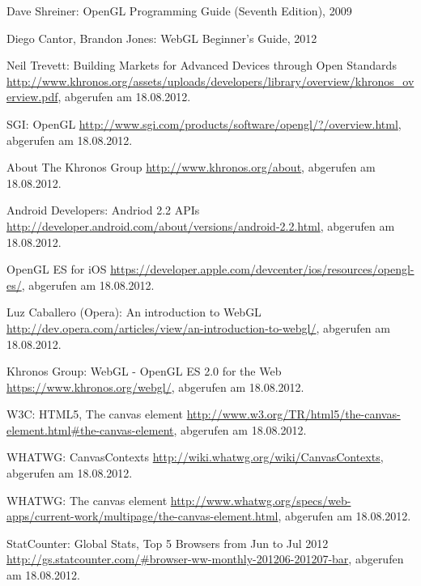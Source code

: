 \begin{thebibliography}{99}

    Dave Shreiner:
    OpenGL Programming Guide (Seventh Edition), 2009

    Diego Cantor, Brandon Jones: 
    WebGL Beginner's Guide, 2012


\cleardoublepage
\hspace{-\leftmargin}{\Large\bfseries Web-Referenzen} %



    Neil Trevett: Building Markets for Advanced Devices through Open Standards
    \url{http://www.khronos.org/assets/uploads/developers/library/overview/khronos_overview.pdf}, abgerufen am 18.08.2012.

    SGI: OpenGL
    \url{http://www.sgi.com/products/software/opengl/?/overview.html}, abgerufen am 18.08.2012.

    About The Khronos Group
    \url{http://www.khronos.org/about}, abgerufen am 18.08.2012.

    Android Developers: Andriod 2.2 APIs
    \url{http://developer.android.com/about/versions/android-2.2.html}, abgerufen am 18.08.2012.

    OpenGL ES for iOS
    \url{https://developer.apple.com/devcenter/ios/resources/opengl-es/}, abgerufen am 18.08.2012.
    
    Luz Caballero (Opera): An introduction to WebGL
    \url{http://dev.opera.com/articles/view/an-introduction-to-webgl/}, abgerufen am 18.08.2012.
        
    Khronos Group: WebGL - OpenGL ES 2.0 for the Web
    \url{https://www.khronos.org/webgl/}, abgerufen am 18.08.2012.
    
    W3C: HTML5, The canvas element
    \url{http://www.w3.org/TR/html5/the-canvas-element.html#the-canvas-element}, abgerufen am 18.08.2012.

    WHATWG: CanvasContexts
    \url{http://wiki.whatwg.org/wiki/CanvasContexts}, abgerufen am 18.08.2012.

    WHATWG: The canvas element
    \url{http://www.whatwg.org/specs/web-apps/current-work/multipage/the-canvas-element.html}, abgerufen am 18.08.2012.

    StatCounter: Global Stats, Top 5 Browsers from Jun to Jul 2012
    \url{http://gs.statcounter.com/#browser-ww-monthly-201206-201207-bar}, abgerufen am 18.08.2012.


\end{thebibliography}

